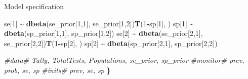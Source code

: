 \documentclass[
  ignorenonframetext,
]{beamer}
\newenvironment{Shaded}{\begin{snugshade}}{\end{snugshade}}
\newcommand{\CommentTok}[1]{\textcolor[rgb]{0.56,0.35,0.01}{\textit{#1}}}
\newcommand{\DecValTok}[1]{\textcolor[rgb]{0.00,0.00,0.81}{#1}}
\newcommand{\ErrorTok}[1]{\textcolor[rgb]{0.64,0.00,0.00}{\textbf{#1}}}
\newcommand{\FunctionTok}[1]{\textcolor[rgb]{0.13,0.29,0.53}{\textbf{#1}}}
\newcommand{\NormalTok}[1]{#1}
\newcommand{\SpecialCharTok}[1]{\textcolor[rgb]{0.81,0.36,0.00}{\textbf{#1}}}
\begin{document}
\begin{frame}[fragile]
\begin{block}{Model specification}
\begin{Shaded}
\begin{Highlighting}[]
\NormalTok{  se[}\DecValTok{1}\NormalTok{] }\SpecialCharTok{\textasciitilde{}} \FunctionTok{dbeta}\NormalTok{(se\_prior[}\DecValTok{1}\NormalTok{,}\DecValTok{1}\NormalTok{], se\_prior[}\DecValTok{1}\NormalTok{,}\DecValTok{2}\NormalTok{])}\FunctionTok{T}\NormalTok{(}\DecValTok{1}\SpecialCharTok{{-}}\NormalTok{sp[}\DecValTok{1}\NormalTok{], )}
\NormalTok{  sp[}\DecValTok{1}\NormalTok{] }\SpecialCharTok{\textasciitilde{}} \FunctionTok{dbeta}\NormalTok{(sp\_prior[}\DecValTok{1}\NormalTok{,}\DecValTok{1}\NormalTok{], sp\_prior[}\DecValTok{1}\NormalTok{,}\DecValTok{2}\NormalTok{])}
\NormalTok{  se[}\DecValTok{2}\NormalTok{] }\SpecialCharTok{\textasciitilde{}} \FunctionTok{dbeta}\NormalTok{(se\_prior[}\DecValTok{2}\NormalTok{,}\DecValTok{1}\NormalTok{], se\_prior[}\DecValTok{2}\NormalTok{,}\DecValTok{2}\NormalTok{])}\FunctionTok{T}\NormalTok{(}\DecValTok{1}\SpecialCharTok{{-}}\NormalTok{sp[}\DecValTok{2}\NormalTok{], )}
\NormalTok{  sp[}\DecValTok{2}\NormalTok{] }\SpecialCharTok{\textasciitilde{}} \FunctionTok{dbeta}\NormalTok{(sp\_prior[}\DecValTok{2}\NormalTok{,}\DecValTok{1}\NormalTok{], sp\_prior[}\DecValTok{2}\NormalTok{,}\DecValTok{2}\NormalTok{])}

  \CommentTok{\#data\# Tally, TotalTests, Populations, se\_prior, sp\_prior}
  \CommentTok{\#monitor\# prev, prob, se, sp}
  \CommentTok{\#inits\# prev, se, sp}
\ErrorTok{\}}
\end{Highlighting}
\end{Shaded}

\normalsize
\end{block}
\end{frame}
\end{document}
